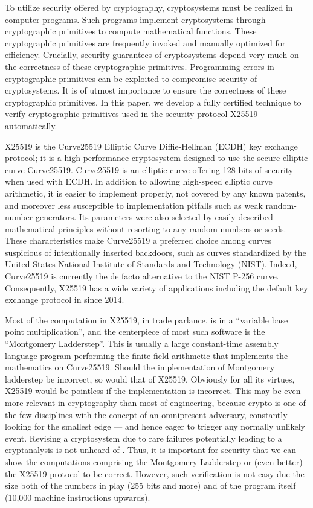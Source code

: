 
To utilize security offered by cryptography, cryptosystems must be
realized in computer programs. Such programs implement cryptosystems
through cryptographic primitives to compute mathematical functions. 
These cryptographic primitives are frequently invoked and manually
optimized for efficiency. Crucially, security guarantees of
cryptosystems depend very much on the correctness of these
cryptographic primitives. Programming errors in cryptographic
primitives can be exploited to compromise security of cryptosystems. 
It is of utmost importance to ensure the correctness of these
cryptographic primitives. In this paper, we develop a fully certified
technique to verify cryptographic primitives used in the security
protocol X25519 automatically.

X25519 is the Curve25519 Elliptic Curve Diffie-Hellman (ECDH) key
exchange protocol; it is a high-performance cryptosystem designed to
use the secure elliptic curve Curve25519. Curve25519 is an elliptic
curve offering 128 bits of security when used with ECDH. In addition
to allowing high-speed elliptic curve arithmetic, it is easier to
implement properly, not covered by any known patents, and moreover
less susceptible to implementation pitfalls such as weak 
random-number generators. Its parameters were also selected by
easily described mathematical principles without resorting to any
random numbers or seeds. These characteristics make Curve25519 a
preferred choice among curves suspicious of intentionally inserted
backdoors, such as curves standardized by the United States National
Institute of Standards and Technology (NIST). 
Indeed, Curve25519 is currently the
de facto alternative to the NIST P-256 curve. Consequently, X25519 has
a wide variety of applications including the default key exchange
protocol in \openssh since 2014.

Most of the computation in X25519, in trade parlance, is in a
``variable base point multiplication'', and the centerpiece of most
such software is the ``Montgomery Ladderstep''. This is usually a
large constant-time assembly language program performing the
finite-field arithmetic that implements the mathematics on Curve25519.
Should the implementation of Montgomery ladderstep be incorrect, so
would that of X25519. Obviously for all its virtues, X25519 would be
pointless if the implementation is incorrect. This may be even more
relevant in cryptography than most of engineering, because crypto is
one of the few disciplines with the concept of an omnipresent
adversary, constantly looking for the smallest edge --- and hence
eager to trigger any normally unlikely event. Revising a cryptosystem
due to rare failures potentially leading to a cryptanalysis is not
unheard of .
Thus, it is important for security that we can show the computations
comprising the Montgomery Ladderstep or (even better) the X25519
protocol to be correct. However, such verification is not easy due
the size both of the numbers in play (255 bits and more) and of the
program itself (10,000 machine instructions upwards).


